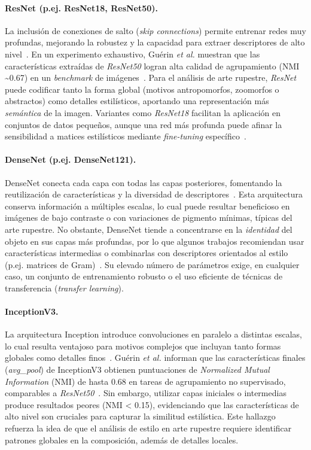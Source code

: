 \paragraph{ResNet (p.ej. ResNet18, ResNet50).}
La inclusión de conexiones de salto (\textit{skip connections}) permite entrenar redes muy profundas, mejorando la robustez y la capacidad para extraer descriptores de alto nivel~\cite{guerin2018}.
En un experimento exhaustivo, Guérin \textit{et al.} muestran que las características extraídas de \textit{ResNet50} logran alta calidad de agrupamiento (NMI \textasciitilde 0.67) en un \textit{benchmark} de imágenes~\cite{guerin2018}.
Para el análisis de arte rupestre, \textit{ResNet} puede codificar tanto la forma global (motivos antropomorfos, zoomorfos o abstractos) como detalles estilísticos, aportando una representación más \textit{semántica} de la imagen.
Variantes como \textit{ResNet18} facilitan la aplicación en conjuntos de datos pequeños, aunque una red más profunda puede afinar la sensibilidad a matices estilísticos mediante \textit{fine-tuning} específico~\cite{gairola2020}.

\paragraph{DenseNet (p.ej. DenseNet121).}
DenseNet conecta cada capa con todas las capas posteriores, fomentando la reutilización de características y la diversidad de descriptores~\cite{dangeti2024}.
Esta arquitectura conserva información a múltiples escalas, lo cual puede resultar beneficioso en imágenes de bajo contraste o con variaciones de pigmento mínimas, típicas del arte rupestre.
No obstante, DenseNet tiende a concentrarse en la \textit{identidad} del objeto en sus capas más profundas, por lo que algunos trabajos recomiendan usar características intermedias o combinarlas con descriptores orientados al estilo (p.ej. matrices de Gram)~\cite{dangeti2024}.
Su elevado número de parámetros exige, en cualquier caso, un conjunto de entrenamiento robusto o el uso eficiente de técnicas de transferencia (\textit{transfer learning}).

\paragraph{InceptionV3.}
La arquitectura Inception introduce convoluciones en paralelo a distintas escalas, lo cual resulta ventajoso para motivos complejos que incluyan tanto formas globales como detalles finos~\cite{guerin2018}.
Guérin \textit{et al.} informan que las características finales (\textit{avg\_pool}) de InceptionV3 obtienen puntuaciones de \textit{Normalized Mutual Information} (NMI) de hasta 0.68 en tareas de agrupamiento no supervisado, comparables a \textit{ResNet50}~\cite{guerin2018}.
Sin embargo, utilizar capas iniciales o intermedias produce resultados peores (NMI < 0.15), evidenciando que las características de alto nivel son cruciales para capturar la similitud estilística.
Este hallazgo refuerza la idea de que el análisis de estilo en arte rupestre requiere identificar patrones globales en la composición, además de detalles locales.

